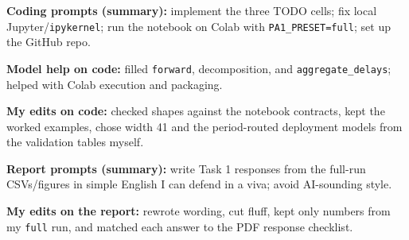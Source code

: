 \documentclass[11pt,a4paper]{article}
\begin{document}
\noindent\textbf{Coding prompts (summary):} implement the three TODO cells; fix local Jupyter/\texttt{ipykernel}; run the notebook on Colab with \texttt{PA1\_PRESET=full}; set up the GitHub repo.

\noindent\textbf{Model help on code:} filled \texttt{forward}, decomposition, and \texttt{aggregate\_delays}; helped with Colab execution and packaging.

\noindent\textbf{My edits on code:} checked shapes against the notebook contracts, kept the worked examples, chose width 41 and the period-routed deployment models from the validation tables myself.

\noindent\textbf{Report prompts (summary):} write Task 1 responses from the full-run CSVs/figures in simple English I can defend in a viva; avoid AI-sounding style.

\noindent\textbf{My edits on the report:} rewrote wording, cut fluff, kept only numbers from my \texttt{full} run, and matched each answer to the PDF response checklist.
\end{document}
